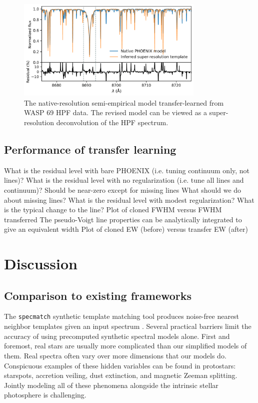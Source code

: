 \documentclass[modern]{aastex631}
\begin{document}
\begin{figure}[hbt!]
    \centering
    \includegraphics[width=0.8\textwidth]{figures/blase_super_resolution_template.png}
    \caption{The native-resolution semi-empirical model transfer-learned from WASP 69 HPF data. The revised model can be viewed as a super-resolution deconvolution of the HPF spectrum.}
    \label{fig_WASP69_regularized}
\end{figure}

\subsection{Performance of transfer learning}


\begin{outline}
    \1 What is the residual level with bare PHOENIX (i.e. tuning continuum only, not lines)?
    \1 What is the residual level with no regularization (i.e. tune all lines and continuum)?
    \2 Should be near-zero except for missing lines
    \2 What should we do about missing lines?
    \1 What is the residual level with modest regularization? What is the typical change to the line?
    \2 Plot of cloned FWHM versus FWHM transferred
    \2 The pseudo-Voigt line properties can be analytically integrated to give an equivalent width
    \2 Plot of cloned EW (before) versus transfer EW (after)
\end{outline}

\section{Discussion}

\subsection{Comparison to existing frameworks}

The \texttt{specmatch} synthetic template matching tool produces noise-free nearest neighbor templates given an input spectrum \citep{2015PhDT........82P}.  Several practical barriers limit the accuracy of using precomputed synthetic spectral models alone. First and foremost, real stars are usually more complicated than our simplified models of them. Real spectra often vary over more dimensions that our models do.  Conspicuous examples of these hidden variables can be found in protostars: starspots, accretion veiling, dust extinction, and magnetic Zeeman splitting. Jointly modeling all of these phenomena alongside the intrinsic stellar photosphere is challenging.
\end{document}
